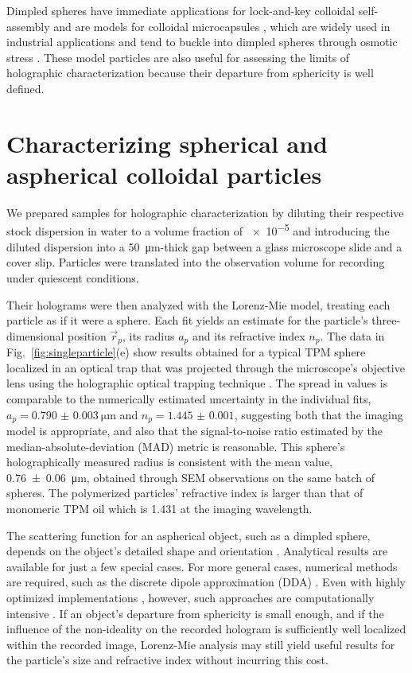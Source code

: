 Dimpled spheres have immediate applications for lock-and-key
colloidal self-assembly
\cite{sacanna10,macfarlane10,sacanna11,ashton13,phillips14,wang14} 
and are models for colloidal microcapsules \cite{chang64}, which are widely
used in industrial applications and tend to buckle into dimpled spheres
through osmotic stress \cite{chang64,knoche11,jose14}. 
These model particles are also useful for assessing the limits of holographic
characterization because their departure from sphericity is well defined.

\section{Characterizing spherical and aspherical colloidal particles}

We prepared samples for holographic characterization
by diluting their respective stock dispersion in water to a volume fraction of
\num{e-5} and introducing the diluted dispersion into a \SI{50}{\um}-thick gap between a
glass microscope slide and a cover slip. Particles were translated into the
observation volume for recording under quiescent conditions. 

Their holograms were then analyzed with the Lorenz-Mie model, treating each
particle as if it were a sphere.
Each fit yields an estimate for the particle's three-dimensional position $\vec{r}_p$,
its radius $a_p$ and its refractive index $n_p$.
The data in Fig.~\ref{fig:singleparticle}(e) show results obtained for
a typical TPM sphere localized in an optical trap that was
projected through the microscope's objective lens using the
holographic optical trapping technique \cite{dufresne98,grier03}.
The spread in values is comparable to the numerically
estimated uncertainty in the individual fits,
$a_p = \SI{0.790(3)}{\um}$ and $n_p = \num{1.445(1)}$,
suggesting both that
the imaging model is appropriate, and also that the signal-to-noise
ratio estimated by the median-absolute-deviation (MAD) metric
is reasonable.
This sphere's holographically measured radius is consistent with the 
mean value, \SI{0.76(6)}{\um}, obtained through SEM observations 
on the same batch of spheres.
The polymerized particles' refractive index is larger 
than that of monomeric TPM oil which is \num{1.431} at the imaging wavelength.

The scattering function for an aspherical object, 
such as a dimpled sphere, depends on the object's detailed shape
and orientation \cite{mishchenko02}.
Analytical results are available for just a few special cases.
For more general cases, numerical methods are required, 
such as the discrete dipole approximation (DDA) \cite{draine94}. 
Even with highly optimized implementations \cite{yurkin11}, however,
such approaches are computationally intensive \cite{fung12,perry12,wang14using}.
If an object's departure from sphericity is small enough, and if the
influence of the non-ideality on the recorded hologram is sufficiently well
localized within the recorded image, Lorenz-Mie analysis
may still yield useful results for the particle's
size and refractive index without incurring this cost.

